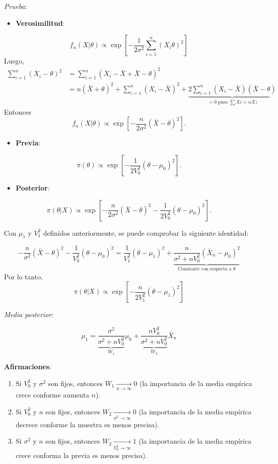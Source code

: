 \documentclass[
  12pt,
]{book}
\providecommand{\tightlist}{%
  \setlength{\itemsep}{0pt}\setlength{\parskip}{0pt}}
\begin{document}
\emph{Prueba}:

\begin{itemize}
\tightlist
\item
  \textbf{Verosimilitud}:
\end{itemize}

\[ f_n(X|\theta) \propto \exp\left[- \dfrac{1}{2\sigma^2} \sum_{i=1}^{n}(X_i\theta)^2\right]\]
Luego,
\begin{align*}
\sum_{i=1}^n (X_i-\theta)^2 & = \sum_{i=1}^n (X_i-\bar X + \bar X - \theta)^2 \\
& = n(\bar X + \theta)^2 + \sum_{i=1}^n (X_i-\bar X)^2 + \underbrace{2 \sum_{i=1}^n (X_i-\bar X)(\bar X - \theta)}_{= 0 \text{ pues } \sum Xi = n\bar X)}
\end{align*}
Entonces
\[ f_n(X|\theta) \propto \exp\left[-\dfrac{n}{2\sigma ^2}(\bar X - \theta )^2\right].\]

\begin{itemize}
\tightlist
\item
  \textbf{Previa}:
\end{itemize}

\[ \pi(\theta) \propto \exp\left[-\dfrac{1}{2V_0^2}(\theta - \mu_0)^2\right].\]

\begin{itemize}
\tightlist
\item
  \textbf{Posterior}:
\end{itemize}

\[ \pi(\theta|X) \propto \exp\left[-\dfrac{n}{2\sigma ^2}(\bar X - \theta )^2-\dfrac{1}{2V_0^2}(\theta - \mu_0)^2\right].\]

Con \(\mu_1\) y \(V_1^2\) definidos anteriormente, se puede comprobar la siguiente identidad:

\[-\dfrac{n}{\sigma ^2}(\bar X - \theta )^2-\dfrac{1}{V_0^2}(\theta - \mu_0)^2= \dfrac{1}{V_1^2}(\theta-\mu_1)^2 + \underbrace{\dfrac{n}{\sigma^2 + nV_0^2}(\bar X_n- \mu_0)^2}_{\text{Constante con respecto a }\theta}\]
Por lo tanto, \[\pi(\theta|X) \propto \exp\left[-\dfrac{n}{2V_1^2}(\theta -\mu_1)^2\right]\]

\emph{Media posterior}:

\[\mu_1 = \underbrace{\dfrac{\sigma^2}{\sigma^2 + nV_0^2}}_{W_1}\mu_0 + \underbrace{\dfrac{nV_0^2}{\sigma^2 + nV_0^2}}_{W_2}
\bar X_n \]

\textbf{Afirmaciones}:

\begin{enumerate}
\def\labelenumi{\arabic{enumi})}
\item
  Si \(V_0^2\) y \(\sigma^2\) son fijos, entonces \(W_1 \xrightarrow[n\to \infty]{}0\) (la importancia de la media empírica crece conforme aumenta \(n\)).
\item
  Si \(V_0^2\) y \(n\) son fijos, entonces \(W_2 \xrightarrow[\sigma^2\to \infty]{}0\) (la importancia de la media empírica decrece conforme la muestra es menos precisa).
\item
  Si \(\sigma^2\) y \(n\) son fijos, entonces \(W_2 \xrightarrow[V_0^2\to \infty]{}1\) (la importancia de la media empírica crece conforma la previa es menos precisa).
\end{enumerate}
\end{document}
